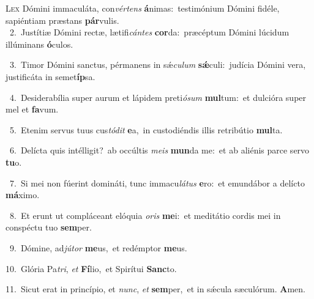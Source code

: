 \lettrine{\initial\textcolor{\initialcolor}{L}}{ex} Dómini immaculáta, con\-\textit{vér}\-\textit{tens} \textbf{á}\-nimas:~\star testimónium Dómini fidéle, sapiéntiam præstans \textbf{pár}\-vulis.\\
{\numbfont\textcolor{\numbcolor}{~2.}}~Justítiæ Dómini rectæ, lætifi\-\textit{cán}\-\textit{tes} \textbf{cor}\-da:~\star præcéptum Dómini lúcidum illúminans \textbf{ó}\-culos.\par
{\numbfont\textcolor{\numbcolor}{~3.}}~Timor Dómini sanctus, pérmanens in sǽ\-\textit{cu}\-\textit{lum} \textbf{sǽ}\-culi:~\star judícia Dómini vera, justificáta in semet\-\textbf{íp}\-sa.\par
{\numbfont\textcolor{\numbcolor}{~4.}}~Desiderabília super aurum et lápidem preti\-\textit{ó}\-\textit{sum} \textbf{mul}\-tum:~\star et dulcióra super mel et \textbf{fa}\-vum.\par
{\numbfont\textcolor{\numbcolor}{~5.}}~Etenim servus tuus cus\-\textit{tó}\-\textit{dit} \textbf{e}\-a,~\star in custodiéndis illis retribútio \textbf{mul}\-ta.\par
{\numbfont\textcolor{\numbcolor}{~6.}}~Delícta quis intélligit?~\dagger ab occúltis \textit{me}\-\textit{is} \textbf{mun}\-da me:~\star et ab aliénis parce servo \textbf{tu}\-o.\par
{\numbfont\textcolor{\numbcolor}{~7.}}~Si mei non fúerint domináti, tunc immacu\-\textit{lá}\-\textit{tus} \textbf{e}\-ro:~\star et emundábor a delícto \textbf{má}\-ximo.\par
{\numbfont\textcolor{\numbcolor}{~8.}}~Et erunt ut compláceant elóquia \textit{o}\-\textit{ris} \textbf{me}\-i:~\star et meditátio cordis mei in conspéctu tuo \textbf{sem}\-per.\par
{\numbfont\textcolor{\numbcolor}{~9.}}~Dómine, ad\-\textit{jú}\-\textit{tor} \textbf{me}\-us,~\star et redémptor \textbf{me}\-us.\par
{\numbfont\textcolor{\numbcolor}{10.}}~Glória Pa\-\textit{tri}\-, \textit{et} \textbf{Fí}\-lio,~\star et Spirítui \textbf{Sanc}\-to.\par
{\numbfont\textcolor{\numbcolor}{11.}}~Sicut erat in princípio, et \textit{nunc}\-, \textit{et} \textbf{sem}\-per,~\star et in sǽcula sæculórum. \textbf{A}\-men.\par
